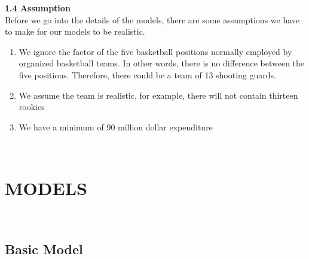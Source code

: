 \documentclass{article}
\begin{document}
\break
\textbf{1.4 Assumption}\\

Before we go into the details of the models, there are some assumptions we have to make for our models to be realistic. 

\begin{enumerate}
\item  We ignore the factor of the five basketball positions normally employed by organized basketball teams. In other words, there is no difference between the five positions. Therefore, there could be a team of 13 shooting guards. 
\item  We assume the team is realistic, for example, there will not contain thirteen rookies
\item We have a minimum of 90 million dollar expenditure
\end{enumerate}\\

\newline 
\section{\centering MODELS }\\
\subsection{Basic Model}\\
\end{document}
